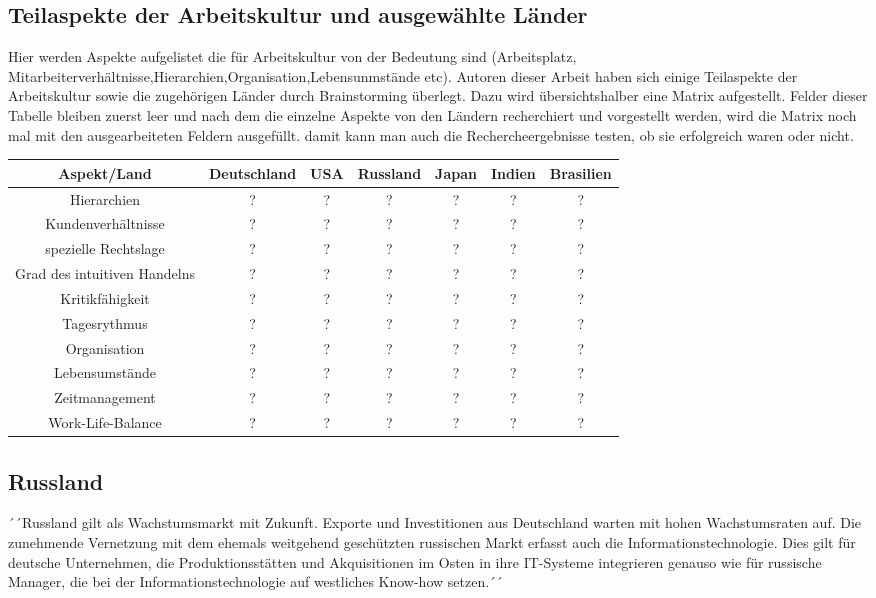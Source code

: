 \subsection{Teilaspekte der Arbeitskultur und ausgewählte Länder}
Hier werden Aspekte aufgelistet die für Arbeitskultur von der Bedeutung sind (Arbeitsplatz, Mitarbeiterverhältnisse,Hierarchien,Organisation,Lebensunmstände etc).
Autoren dieser Arbeit haben sich einige Teilaspekte der Arbeitskultur sowie die zugehörigen Länder durch Brainstorming überlegt. Dazu wird übersichtshalber eine Matrix aufgestellt. Felder dieser Tabelle bleiben zuerst leer und nach dem die einzelne Aspekte von den Ländern recherchiert und vorgestellt werden, wird die Matrix noch mal mit den ausgearbeiteten Feldern ausgefüllt. damit kann man auch die Rechercheergebnisse testen, ob sie erfolgreich waren oder nicht. \\
\begin{tabular}{|c|c|c|c|c|c|c|}
\hline  Aspekt/Land& Deutschland & USA & Russland & Japan & Indien & Brasilien \\ 
\hline Hierarchien  & ? & ? & ? & ? & ? & ? \\ 
\hline  Kundenverhältnisse& ? & ? & ? & ? & ? & ? \\ 
\hline  spezielle Rechtslage& ? & ? & ? & ? & ? & ? \\ 
\hline  Grad des intuitiven Handelns& ? & ? & ? & ? & ? & ? \\ 
\hline  Kritikfähigkeit& ? & ? & ? & ? & ? & ? \\ 
\hline  Tagesrythmus& ? & ? & ? & ? & ? & ? \\ 
\hline  Organisation& ? & ? & ? & ? & ? & ? \\ 
\hline  Lebensumstände& ? & ? & ? & ? & ? & ? \\ 
\hline  Zeitmanagement& ? & ? & ? & ? & ? & ? \\ 
\hline  Work-Life-Balance& ? & ? & ? & ? & ? & ? \\ 
\hline 
\end{tabular} 

	\subsection{Russland}
	´´Russland gilt als Wachstumsmarkt mit Zukunft. Exporte und Investitionen aus Deutschland warten mit hohen Wachstumsraten auf. Die zunehmende Vernetzung mit dem ehemals weitgehend geschützten russischen Markt erfasst auch die Informationstechnologie. Dies gilt für deutsche Unternehmen, die Produktionsstätten und Akquisitionen im Osten in ihre IT-Systeme integrieren genauso wie für russische Manager, die bei der Informationstechnologie auf westliches Know-how setzen.´´\\
	
